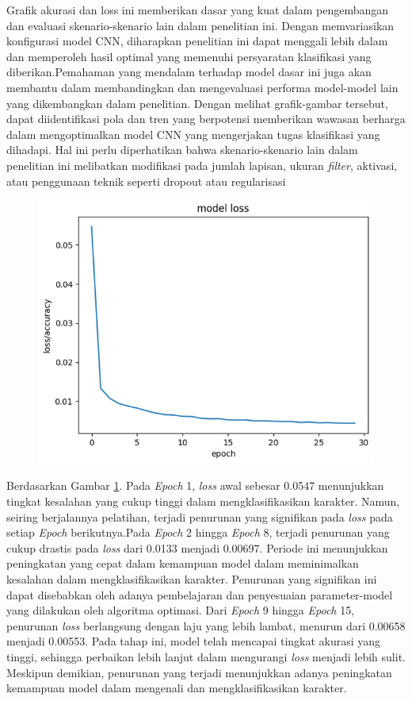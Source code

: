 Grafik akurasi dan loss ini memberikan dasar yang kuat dalam pengembangan dan evaluasi skenario-skenario lain dalam penelitian ini. Dengan memvariasikan konfigurasi model CNN, diharapkan penelitian ini dapat menggali lebih dalam dan memperoleh hasil optimal yang memenuhi persyaratan klasifikasi yang diberikan.Pemahaman yang mendalam terhadap model dasar ini juga akan membantu dalam membandingkan dan mengevaluasi performa model-model lain yang dikembangkan dalam penelitian. Dengan melihat grafik-gambar tersebut, dapat diidentifikasi pola dan tren yang berpotensi memberikan wawasan berharga dalam mengoptimalkan model CNN yang mengerjakan tugas klasifikasi yang dihadapi. Hal ini perlu diperhatikan bahwa skenario-skenario lain dalam penelitian ini melibatkan modifikasi pada jumlah lapisan, ukuran \textit{filter}, aktivasi, atau penggunaan teknik seperti dropout atau regularisasi
\begin{figure}[!hbt]
	\centering
	\includegraphics[width=0.7\linewidth]{gambar/bener/Loss_ModelCNN.png}
	\label{fig:lossModelCNN1}
\end{figure}
Berdasarkan Gambar \ref{fig:lossModelCNN1}. Pada \textit{Epoch} 1, \textit{loss} awal sebesar 0.0547 menunjukkan tingkat kesalahan yang cukup tinggi dalam mengklasifikasikan karakter. Namun, seiring berjalannya pelatihan, terjadi penurunan yang signifikan pada \textit{loss} pada setiap \textit{Epoch} berikutnya.Pada \textit{Epoch} 2 hingga \textit{Epoch} 8, terjadi penurunan yang cukup drastis pada \textit{loss} dari 0.0133 menjadi 0.00697. Periode ini menunjukkan peningkatan yang cepat dalam kemampuan model dalam meminimalkan kesalahan dalam mengklasifikasikan karakter. Penurunan yang signifikan ini dapat disebabkan oleh adanya pembelajaran dan penyesuaian parameter-model yang dilakukan oleh algoritma optimasi. Dari \textit{Epoch} 9 hingga \textit{Epoch} 15, penurunan \textit{loss} berlangsung dengan laju yang lebih lambat, menurun dari 0.00658 menjadi 0.00553. Pada tahap ini, model telah mencapai tingkat akurasi yang tinggi, sehingga perbaikan lebih lanjut dalam mengurangi \textit{loss} menjadi lebih sulit. Meskipun demikian, penurunan yang terjadi menunjukkan adanya peningkatan kemampuan model dalam mengenali dan mengklasifikasikan karakter.

